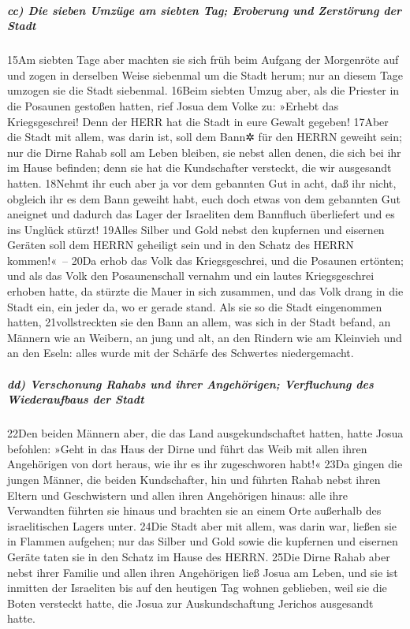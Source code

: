 \hypertarget{cc-die-sieben-umzuxfcge-am-siebten-tag-eroberung-und-zerstuxf6rung-der-stadt}{%
\subparagraph{cc) Die sieben Umzüge am siebten Tag; Eroberung und
Zerstörung der
Stadt}\label{cc-die-sieben-umzuxfcge-am-siebten-tag-eroberung-und-zerstuxf6rung-der-stadt}}

15Am siebten Tage aber machten sie sich früh beim Aufgang der Morgenröte
auf und zogen in derselben Weise siebenmal um die Stadt herum; nur an
diesem Tage umzogen sie die Stadt siebenmal. 16Beim siebten Umzug aber,
als die Priester in die Posaunen gestoßen hatten, rief Josua dem Volke
zu: »Erhebt das Kriegsgeschrei! Denn der HERR hat die Stadt in eure
Gewalt gegeben! 17Aber die Stadt mit allem, was darin ist, soll dem
Bann✲ für den HERRN geweiht sein; nur die Dirne Rahab soll am Leben
bleiben, sie nebst allen denen, die sich bei ihr im Hause befinden; denn
sie hat die Kundschafter versteckt, die wir ausgesandt hatten. 18Nehmt
ihr euch aber ja vor dem gebannten Gut in acht, daß ihr nicht, obgleich
ihr es dem Bann geweiht habt, euch doch etwas von dem gebannten Gut
aneignet und dadurch das Lager der Israeliten dem Bannfluch überliefert
und es ins Unglück stürzt! 19Alles Silber und Gold nebst den kupfernen
und eisernen Geräten soll dem HERRN geheiligt sein und in den Schatz des
HERRN kommen!«~-- 20Da erhob das Volk das Kriegsgeschrei, und die
Posaunen ertönten; und als das Volk den Posaunenschall vernahm und ein
lautes Kriegsgeschrei erhoben hatte, da stürzte die Mauer in sich
zusammen, und das Volk drang in die Stadt ein, ein jeder da, wo er
gerade stand. Als sie so die Stadt eingenommen hatten, 21vollstreckten
sie den Bann an allem, was sich in der Stadt befand, an Männern wie an
Weibern, an jung und alt, an den Rindern wie am Kleinvieh und an den
Eseln: alles wurde mit der Schärfe des Schwertes niedergemacht.

\hypertarget{dd-verschonung-rahabs-und-ihrer-angehuxf6rigen-verfluchung-des-wiederaufbaus-der-stadt}{%
\subparagraph{dd) Verschonung Rahabs und ihrer Angehörigen; Verfluchung
des Wiederaufbaus der
Stadt}\label{dd-verschonung-rahabs-und-ihrer-angehuxf6rigen-verfluchung-des-wiederaufbaus-der-stadt}}

22Den beiden Männern aber, die das Land ausgekundschaftet hatten, hatte
Josua befohlen: »Geht in das Haus der Dirne und führt das Weib mit allen
ihren Angehörigen von dort heraus, wie ihr es ihr zugeschworen habt!«
23Da gingen die jungen Männer, die beiden Kundschafter, hin und führten
Rahab nebst ihren Eltern und Geschwistern und allen ihren Angehörigen
hinaus: alle ihre Verwandten führten sie hinaus und brachten sie an
einem Orte außerhalb des israelitischen Lagers unter. 24Die Stadt aber
mit allem, was darin war, ließen sie in Flammen aufgehen; nur das Silber
und Gold sowie die kupfernen und eisernen Geräte taten sie in den Schatz
im Hause des HERRN. 25Die Dirne Rahab aber nebst ihrer Familie und allen
ihren Angehörigen ließ Josua am Leben, und sie ist inmitten der
Israeliten bis auf den heutigen Tag wohnen geblieben, weil sie die Boten
versteckt hatte, die Josua zur Auskundschaftung Jerichos ausgesandt
hatte.

